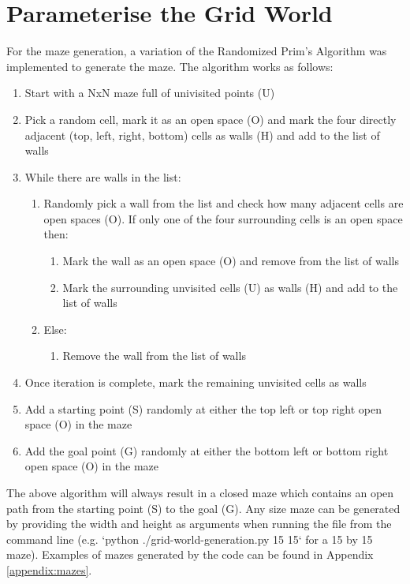 \documentclass[twoside, 12pt, a4paper]{article}
\begin{document}
\section{Parameterise the Grid World}
For the maze generation, a variation of the Randomized Prim’s Algorithm was implemented to generate the maze. The algorithm works as follows:
\begin{enumerate}
\item Start with a NxN maze full of univisited points (U)
\item Pick a random cell, mark it as an open space (O) and mark the four directly adjacent (top, left, right, bottom) cells as walls (H) and add to the list of walls
\item While there are walls in the list:
\begin{enumerate}
\item Randomly pick a wall from the list and check how many adjacent cells are open spaces (O). If only one of the four surrounding cells is an open space then:
\begin{enumerate}
\item Mark the wall as an open space (O) and remove from the list of walls
\item Mark the surrounding unvisited cells (U) as walls (H) and add to the list of walls
\end{enumerate}
\item Else:
\begin{enumerate}
\item Remove the wall from the list of walls
\end{enumerate}
\end{enumerate}
\item Once iteration is complete, mark the remaining unvisited cells as walls
\item Add a starting point (S) randomly at either the top left or top right open space (O) in the maze
\item Add the goal point (G) randomly at either the bottom left or bottom right open space (O) in the maze
\end{enumerate}
The above algorithm will always result in a closed maze which contains an open path from the starting point (S) to the goal (G). Any size maze can be generated by providing the width and height as arguments when running the file from the command line (e.g. `python ./grid-world-generation.py 15 15` for a 15 by 15 maze). Examples of mazes generated by the code can be found in Appendix \ref{appendix:mazes}.
\end{document}
